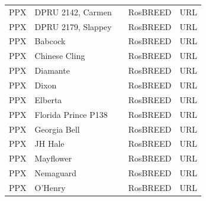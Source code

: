\documentclass[12pt]{article}
\begin{document}
\begin{center}
\begin{longtable}{lllll}
                 PP{\color{red}X} &DPRU 2142, Carmen & &RosBREED &URL \\
                 PP{\color{red}X} &DPRU 2179, Slappey & &RosBREED &URL \\
                 PP{\color{red}X} &Babcock& &RosBREED &URL \\
                 PP{\color{red}X} &Chinese Cling& &RosBREED &URL \\
                 PP{\color{red}X} &Diamante& &RosBREED &URL \\
                 PP{\color{red}X} &Dixon& &RosBREED &URL \\
                 PP{\color{red}X} &Elberta& &RosBREED &URL \\
                 PP{\color{red}X} &Florida Prince P138& &RosBREED &URL \\
                 PP{\color{red}X} &Georgia Bell& &RosBREED &URL \\
                 PP{\color{red}X} &JH Hale& &RosBREED &URL \\
                 PP{\color{red}X} &Mayflower& &RosBREED &URL \\
                 PP{\color{red}X} &Nemaguard & &RosBREED &URL \\
                 PP{\color{red}X} &O’Henry & &RosBREED &URL \\

\end{longtable}
\end{center}
\end{document}
